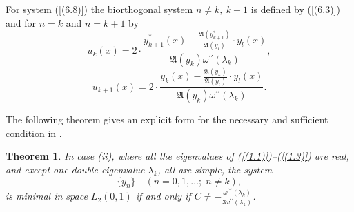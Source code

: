 \documentclass[10pt,a4paper]{amsart}
\newtheorem{thm}{Theorem}[section]
\numberwithin{equation}{section}
\begin{document}
For system (\ref{(6.8)}) the biorthogonal system  $n \ne k,\ k+1$ is defined by (\ref{(6.3)}) and for 
$n = k$ and $n = k+1$ by
\begin{equation}
u_k(x)=2\cdot\frac{y^*_{k+1}(x)-\frac{\mathfrak{A}(y^*_{k+1})}{\mathfrak{A}(y_l)}\cdot y_l(x)}{ \mathfrak{A}(y_k)\omega^{\prime\prime}(\lambda_k)}
, \label{(6.13)}
\end{equation}
\begin{equation}
u_{k+1}(x)=2\cdot\frac{y_k(x)-\frac{\mathfrak{A}(y_{k})}{\mathfrak{A}(y_l)}\cdot y_l(x)}{ \mathfrak{A}(y_{k})\omega^{\prime\prime}(\lambda_k)}
. \label{(6.14)}
\end{equation}


The following theorem gives an explicit form for the necessary and sufficient condition in \cite{aliyev5}.
\begin{thm} 
In case (ii), where  all the eigenvalues of (\ref{(1.1)})--(\ref{(1.3)}) are real, and except one double eigenvalue $\lambda_k$, all are simple, the system
\begin{equation}
  \{ y_n \} \quad (n = 0,1,\ldots;\; n \neq k), \label{(6.9)} 
\end{equation}
is minimal in space $L_2(0,1)$ if and only if $C\neq-\frac{\omega^{\prime\prime\prime}(\lambda_k)}{3\omega^{\prime\prime}(\lambda_k)}$.
\end{thm}
\end{document}
